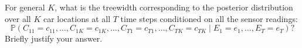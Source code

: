\item {}
For general $K$, what is the treewidth corresponding to the posterior
distribution over all $K$ car locations at all $T$ time steps conditioned on all
the sensor readings:
\[\mathbb P(C_{11} = c_{11}, \dots, C_{1K} = c_{1K}, \dots, C_{T1} = c_{T1}, \dots, C_{TK} = c_{TK} \mid E_1 = e_1, \dots, E_T = e_T)?\]
Briefly justify your answer.
